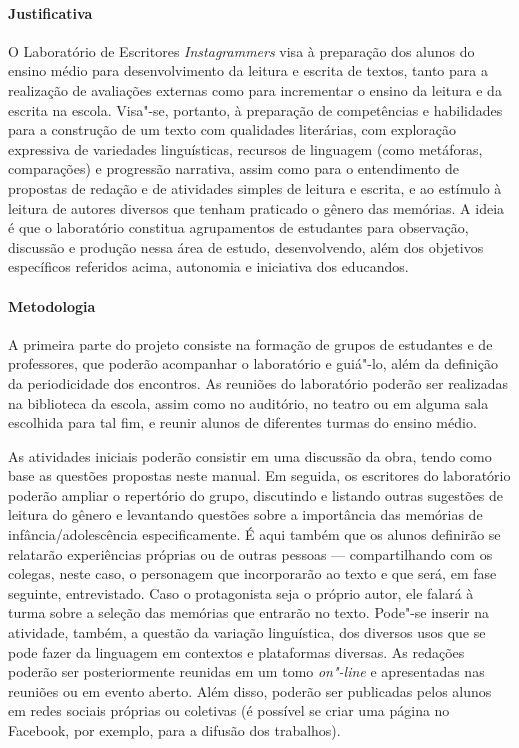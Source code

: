 \documentclass[11pt]{extarticle}
\begin{document}
\paragraph{Justificativa}
O Laboratório de Escritores \emph{Instagrammers} visa à preparação dos
alunos do ensino médio para desenvolvimento da leitura e escrita de
textos, tanto para a realização de avaliações externas como para
incrementar o ensino da leitura e da escrita na escola. Visa"-se,
portanto, à preparação de competências e habilidades para a construção
de um texto com qualidades literárias, com exploração expressiva de
variedades linguísticas, recursos de linguagem (como metáforas,
comparações) e progressão narrativa, assim como para o entendimento de
propostas de redação e de atividades simples de leitura e escrita, e ao
estímulo à leitura de autores diversos que tenham praticado o gênero das
memórias. A ideia é que o laboratório constitua agrupamentos de
estudantes para observação, discussão e produção nessa área de estudo,
desenvolvendo, além dos objetivos específicos referidos acima, autonomia
e iniciativa dos educandos.

\paragraph{Metodologia}
A primeira parte do projeto consiste na formação de grupos de estudantes
e de professores, que poderão acompanhar o laboratório e guiá"-lo, além
da definição da periodicidade dos encontros. As reuniões do laboratório
poderão ser realizadas na biblioteca da escola, assim como no auditório,
no teatro ou em alguma sala escolhida para tal fim, e reunir alunos de
diferentes turmas do ensino médio.

As atividades iniciais poderão consistir em uma discussão da obra, tendo
como base as questões propostas neste manual. Em seguida, os escritores
do laboratório poderão ampliar o repertório do grupo, discutindo e
listando outras sugestões de leitura do gênero e levantando questões
sobre a importância das memórias de infância/adolescência
especificamente. É aqui também que os alunos definirão se relatarão
experiências próprias ou de outras pessoas --- compartilhando com os
colegas, neste caso, o personagem que incorporarão ao texto e que será,
em fase seguinte, entrevistado. Caso o protagonista seja o próprio
autor, ele falará à turma sobre a seleção das memórias que entrarão no
texto. Pode"-se inserir na atividade, também, a questão da variação
linguística, dos diversos usos que se pode fazer da linguagem em
contextos e plataformas diversas. As redações poderão ser posteriormente reunidas em um
tomo \emph{on"-line} e apresentadas nas reuniões ou em
evento aberto. Além disso, poderão ser publicadas pelos alunos em redes
sociais próprias ou coletivas (é possível se criar uma página no
Facebook, por exemplo, para a difusão dos trabalhos).
\end{document}
